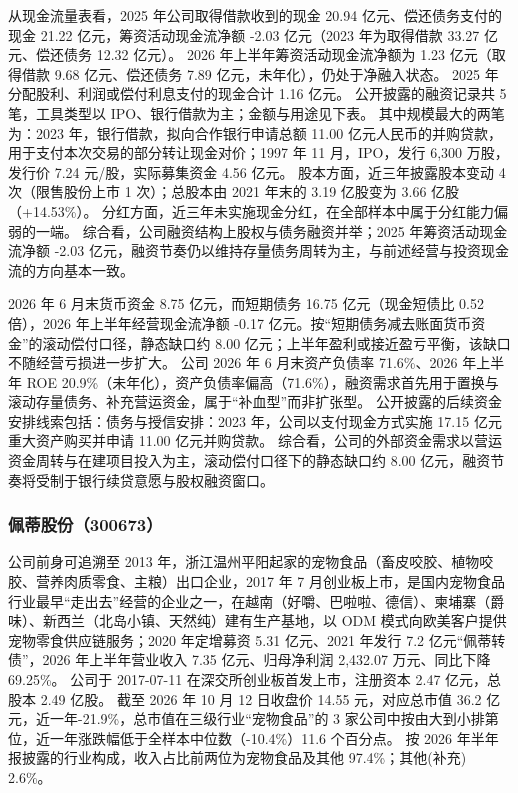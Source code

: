  从现金流量表看，2025 年公司取得借款收到的现金 20.94 亿元、偿还债务支付的现金 21.22 亿元，筹资活动现金流净额 -2.03 亿元（2023 年为取得借款 33.27 亿元、偿还债务 12.32 亿元）。 2026 年上半年筹资活动现金流净额为 1.23 亿元（取得借款 9.68 亿元、偿还债务 7.89 亿元，未年化），仍处于净融入状态。 2025 年分配股利、利润或偿付利息支付的现金合计 1.16 亿元。 公开披露的融资记录共 5 笔，工具类型以 IPO、银行借款为主；金额与用途见下表。 其中规模最大的两笔为：2023 年，银行借款，拟向合作银行申请总额 11.00 亿元人民币的并购贷款，用于支付本次交易的部分转让现金对价；1997 年 11 月，IPO，发行 6,300 万股，发行价 7.24 元/股，实际募集资金 4.56 亿元。 股本方面，近三年披露股本变动 4 次（限售股份上市 1 次）；总股本由 2021 年末的 3.19 亿股变为 3.66 亿股（+14.53\%）。 分红方面，近三年未实施现金分红，在全部样本中属于分红能力偏弱的一端。 综合看，公司融资结构上股权与债务融资并举；2025 年筹资活动现金流净额 -2.03 亿元，融资节奏仍以维持存量债务周转为主，与前述经营与投资现金流的方向基本一致。

 2026 年 6 月末货币资金 8.75 亿元，而短期债务 16.75 亿元（现金短债比 0.52 倍），2026 年上半年经营现金流净额 -0.17 亿元。按“短期债务减去账面货币资金”的滚动偿付口径，静态缺口约 8.00 亿元；上半年盈利或接近盈亏平衡，该缺口不随经营亏损进一步扩大。 公司 2026 年 6 月末资产负债率 71.6\%、2026 年上半年 ROE 20.9\%（未年化），资产负债率偏高（71.6\%），融资需求首先用于置换与滚动存量债务、补充营运资金，属于“补血型”而非扩张型。 公开披露的后续资金安排线索包括：债务与授信安排：2023 年，公司以支付现金方式实施 17.15 亿元重大资产购买并申请 11.00 亿元并购贷款。 综合看，公司的外部资金需求以营运资金周转与在建项目投入为主，滚动偿付口径下的静态缺口约 8.00 亿元，融资节奏将受制于银行续贷意愿与股权融资窗口。




\subsubsection{佩蒂股份（300673）}
\label{co:300673}

 公司前身可追溯至 2013 年，浙江温州平阳起家的宠物食品（畜皮咬胶、植物咬胶、营养肉质零食、主粮）出口企业，2017 年 7 月创业板上市，是国内宠物食品行业最早“走出去”经营的企业之一，在越南（好嚼、巴啦啦、德信）、柬埔寨（爵味）、新西兰（北岛小镇、天然纯）建有生产基地，以 ODM 模式向欧美客户提供宠物零食供应链服务；2020 年定增募资 5.31 亿元、2021 年发行 7.2 亿元“佩蒂转债”，2026 年上半年营业收入 7.35 亿元、归母净利润 2,432.07 万元、同比下降 69.25\%。 公司于 2017-07-11 在深交所创业板首发上市，注册资本 2.47 亿元，总股本 2.49 亿股。 截至 2026 年 10 月 12 日收盘价 14.55 元，对应总市值 36.2 亿元，近一年-21.9\%，总市值在三级行业“宠物食品”的 3 家公司中按由大到小排第位，近一年涨跌幅低于全样本中位数（-10.4\%）11.6 个百分点。 按 2026 年半年报披露的行业构成，收入占比前两位为宠物食品及其他 97.4\%；其他(补充) 2.6\%。


